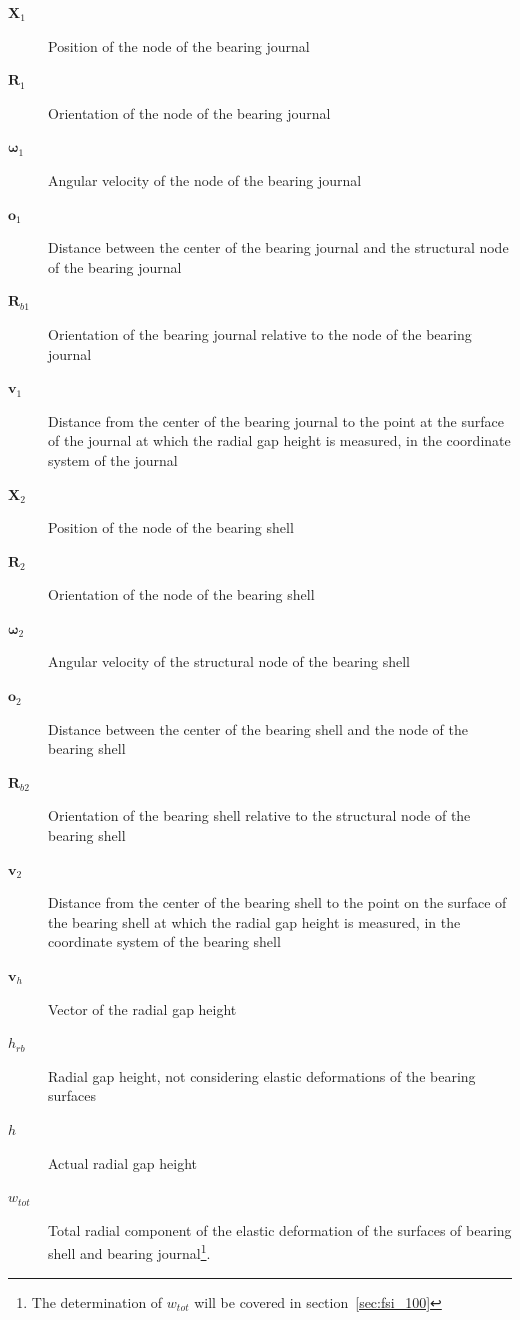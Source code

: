\begin{description}
\item[$\boldsymbol{X}_1$] Position of the node of the bearing journal
\item[$\boldsymbol{R}_1$] Orientation of the node of the bearing journal
\item[$\boldsymbol{\omega}_1$] Angular velocity of the node of the bearing journal
\item[$\boldsymbol{o}_1$] Distance between the center of the bearing journal and the structural node of the bearing journal
\item[$\boldsymbol{R}_{b1}$] Orientation of the bearing journal relative to the node of the bearing journal
\item[$\boldsymbol{v}_1$] Distance from the center of the bearing journal to the point at the surface of the journal at which the radial gap height is measured, in the coordinate system of the journal
\item[$\boldsymbol{X}_2$] Position of the node of the bearing shell
\item[$\boldsymbol{R}_2$] Orientation of the node of the bearing shell
\item[$\boldsymbol{\omega}_2$] Angular velocity of the structural node of the bearing shell
\item[$\boldsymbol{o}_2$] Distance between the center of the bearing shell and the node of the bearing shell
\item[$\boldsymbol{R}_{b2}$] Orientation of the bearing shell relative to the structural node of the bearing shell
\item[$\boldsymbol{v}_2$] Distance from the center of the bearing shell to the point on the surface of the bearing shell at which the radial gap height is measured, in the coordinate system of the bearing shell
\item[$\boldsymbol{v}_h$] Vector of the radial gap height
\item[$h_{rb}$] Radial gap height, not considering elastic deformations of the bearing surfaces
\item[$h$] Actual radial gap height
\item[$w_{tot}$] Total radial component of the elastic deformation of the surfaces of bearing shell and bearing journal\footnote{The determination of ${w}_{tot}$ will be covered in section~\ref{sec:fsi_100}}.
\end{description}

